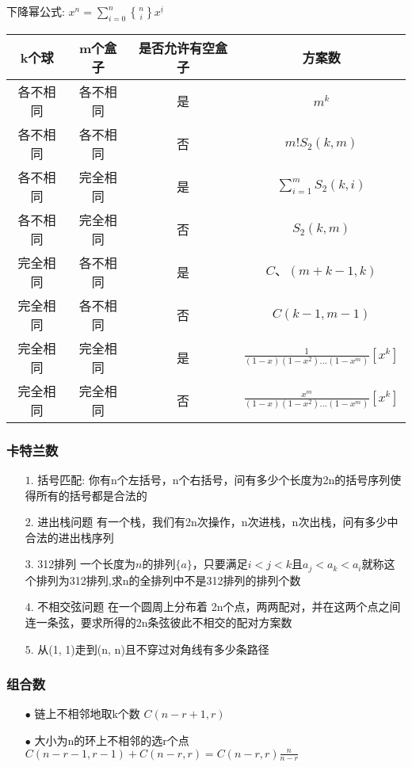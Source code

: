 \documentclass[UTF8]{article}
\newcommand{\cppcode}[1]{
    
}
\begin{document}
	下降幂公式: $x^n = \sum_{i=0}^n {n\brace i} x^{\underline i}$
	\begin{table}[h!]
		\begin{tabular}{|c|c|c|c|}
		\hline
		\textbf{k个球} & {m个盒子} & {是否允许有空盒子} & {方案数}\\
		\hline
	    各不相同 & 各不相同 & 是 & $m^k$ \\
	    各不相同 & 各不相同 & 否 & $m!S_2(k, m)$\\
	    各不相同 & 完全相同 & 是 & $\sum_{i=1}^{m} S_2(k, i)$\\
		各不相同 & 完全相同 & 否 & $S_2(k, m)$\\
		完全相同 & 各不相同 & 是 & $C、(m+k-1, k)$\\
		完全相同 & 各不相同 & 否 & $C(k-1, m-1)$\\
		完全相同 & 完全相同 & 是 & $\frac{1}{(1-x)(1-x^2)...(1-x^m)}[x^k]$\\ 
		完全相同 & 完全相同 & 否 & $\frac{x^m}{(1-x)(1-x^2)...(1-x^m)}[x^k]$\\ 
		\hline
		\end{tabular}
	\end{table}
	
\subsubsection{卡特兰数}
	\begin{enumerate}
		\item[$1.$] 括号匹配: 你有n个左括号，n个右括号，问有多少个长度为2n的括号序列使得所有的括号都是合法的
		\item[$2.$] 进出栈问题
		   有一个栈，我们有2n次操作，n次进栈，n次出栈，问有多少中合法的进出栈序列	
		\item[$3.$] 312排列
		    一个长度为$n$的排列$\{a\}$，只要满足$i<j<k$且$a_j<a_k<a_i$就称这个排列为312排列,求n的全排列中不是312排列的排列个数
		\item[$4.$] 不相交弦问题
		    在一个圆周上分布着 2n个点，两两配对，并在这两个点之间连一条弦，要求所得的2n条弦彼此不相交的配对方案数
		\item[$5.$] 从(1, 1)走到(n, n)且不穿过对角线有多少条路径
	\end{enumerate}
\cppcode{Caterlan.cpp}
	
\subsubsection{组合数}
	\begin{enumerate}
		\item[$\bullet$] 链上不相邻地取k个数 $C(n-r+1, r)$
		\item[$\bullet$] 大小为n的环上不相邻的选r个点 $C(n-r-1,r-1) + C(n-r, r) = C(n-r, r)\frac{n}{n-r}$
	\end{enumerate}
\end{document}
